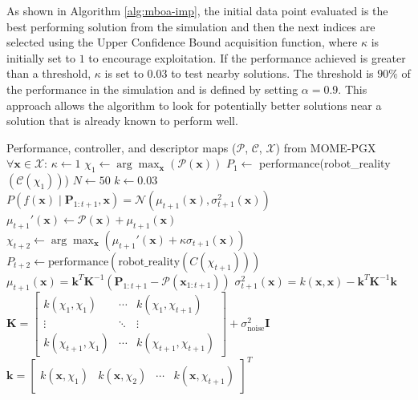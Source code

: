 \documentclass[12pt]{article}
\begin{document}
As shown in Algorithm \ref{alg:mboa-imp}, the initial data point evaluated is the best performing solution from the simulation and then the next indices are selected using the Upper Confidence Bound acquisition function, where $\kappa$ is initially set to $1$ to encourage exploitation. If the performance achieved is greater than a threshold, $\kappa$ is set to $0.03$ to test nearby solutions. The threshold is $90\%$ of the performance in the simulation and is defined by setting $\alpha=0.9$. This approach allows the algorithm to look for potentially better solutions near a solution that is already known to perform well.
\begin{algorithm}[H]
\caption{Bayesian Optimization for Adaptation}\label{alg:mboa-imp}
\begin{algorithmic}
\Require Performance, controller, and descriptor maps ($\mathcal{P}$, $\mathcal{C}$, $\mathcal{X}$) from MOME-PGX \State $\forall \mathbf{x} \in \mathcal{X}$:
    \State \hspace{1em} $\kappa \gets 1$ 
    \State \hspace{1em} $\chi_{1} \gets \arg\max_{\mathbf{x}} (\mathcal{P}(\mathbf{x}))$ 
    \State \hspace{1em} $P_{1} \gets$ performance(robot\_reality$(\mathcal{C}(\chi_{1}))$) 
    \State \hspace{1em} $N \gets 50$ 
    \State $k \gets 0.03$ 
\EndIf
\State $P(f(\mathbf{x}) \mid \mathbf{P}_{1:t+1}, \mathbf{x}) = \mathcal{N}(\mu_{t+1}(\mathbf{x}), \sigma_{t+1}^2(\mathbf{x}))$
\State $\mu_{t+1}'(\mathbf{x}) \gets \mathcal{P}(\mathbf{x}) + \mu_{t+1}(\mathbf{x})$ 
\State $\chi_{t+2} \leftarrow \arg\max_{\mathbf{x}}(\mu_{t+1}'(\mathbf{x}) + \kappa \sigma_{t+1}(\mathbf{x}))$
    \State $P_{t+2} \leftarrow \text{performance}(\text{robot\_reality}(C(\chi_{t+1})))$
\State {}
    \State $\mu_{t+1}(\mathbf{x}) = \mathbf{k}^T \mathbf{K}^{-1} (\mathbf{P}_{1:t+1} - \mathcal{P}(\mathbf{x}_{1:t+1}))$
    \State $\sigma_{t+1}^2(\mathbf{x}) = k(\mathbf{x}, \mathbf{x}) - \mathbf{k}^T \mathbf{K}^{-1} \mathbf{k}$
    \State $\mathbf{K} = 
    \begin{bmatrix}
        k(\chi_1, \chi_1) & \cdots & k(\chi_1, \chi_{t+1}) \\
        \vdots & \ddots & \vdots \\
        k(\chi_{t+1}, \chi_1) & \cdots & k(\chi_{t+1}, \chi_{t+1})
    \end{bmatrix}
    + \sigma_{\text{noise}}^2 \mathbf{I}$
    \State $\mathbf{k} = 
    \begin{bmatrix}
        k(\mathbf{x}, \chi_1) & k(\mathbf{x}, \chi_2) & \cdots & k(\mathbf{x}, \chi_{t+1})
    \end{bmatrix}^T$

\EndFor
\end{algorithmic}
\end{algorithm}
\end{document}
